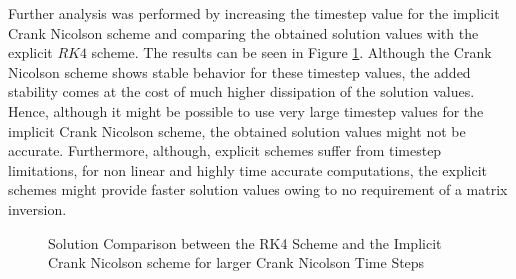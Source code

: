 \documentclass[12pt]{article}
\begin{document}
Further analysis was performed by increasing the timestep value for the implicit Crank Nicolson scheme and comparing the obtained solution values with the explicit $RK4$ scheme. The results can be seen in Figure \ref{fig:CNTimestep}. Although the Crank Nicolson scheme shows stable behavior for these timestep values, the added stability comes at the cost of much higher dissipation of the solution values. Hence, although it might be possible to use very large timestep values for the implicit Crank Nicolson scheme, the obtained solution values might not be accurate. Furthermore, although, explicit schemes suffer from timestep limitations, for non linear and highly time accurate computations, the explicit schemes might provide faster solution values owing to no requirement of a matrix inversion.
\begin{figure}
\centering
    \qquad
    \caption{Solution Comparison between the RK4 Scheme and the Implicit Crank Nicolson scheme for larger Crank Nicolson Time Steps}%
    \label{fig:CNTimestep}%
\end{figure}
\end{document}
